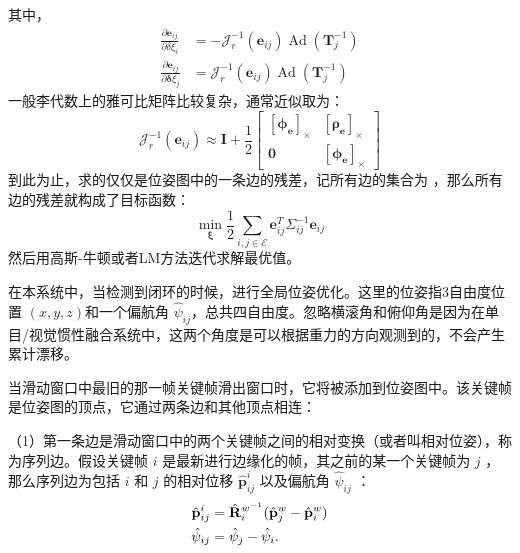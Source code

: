 其中，
\begin{equation}
\label{eqn:4.42}
\begin{aligned}
\frac{\partial \boldsymbol{e}_{i j}}{\partial \delta \xi_{i}} &= -\bm{\mathcal{J}}_{r}^{-1}\left(\boldsymbol{e}_{i j}\right) \operatorname{Ad}\left(\boldsymbol{T}_{j}^{-1}\right) \\
\frac{\partial \boldsymbol{e}_{i j}}{\partial \boldsymbol{\delta} \xi_{j}} &= \bm{\mathcal{J}}_{r}^{-1}\left(\boldsymbol{e}_{i j}\right) \operatorname{Ad}\left(\boldsymbol{T}_{j}^{-1}\right)
\end{aligned}
\end{equation}
一般李代数上的雅可比矩阵比较复杂，通常近似取为：
\begin{equation}
\label{eqn:4.43}
\bm{\mathcal{J}}_{r}^{-1}\left(\boldsymbol{e}_{i j}\right) \approx 
\boldsymbol{I}+\frac{1}{2} \left[ 
\begin{array}{cc}
{\left[\boldsymbol{\phi}_{\boldsymbol{e}} \right]_\times} & { \left[ \boldsymbol{\rho}_{\boldsymbol{e}} \right]_\times } \\ 
{\mathbf{0}} & { \left[\bm{\phi}_{\boldsymbol{e}}\right]_\times}
\end{array}
\right]
\end{equation}
到此为止，求的仅仅是位姿图中的一条边的残差，记所有边的集合为 ，那么所有边的残差就构成了目标函数：
\begin{equation}
\label{eqn:4.44}
\min _{\bm{\xi}} \frac{1}{2} \sum_{i, j \in \mathcal{E}} \bm{e}_{i j}^{T} \Sigma_{i j}^{-1} \bm{e}_{i j}
\end{equation}
然后用高斯-牛顿或者LM方法迭代求解最优值。

在本系统中，当检测到闭环的时候，进行全局位姿优化。这里的位姿指3自由度位置 $(x,y,z) $和一个偏航角 $\hat{\psi}_{ij} $，总共四自由度。忽略横滚角和俯仰角是因为在单目/视觉惯性融合系统中，这两个角度是可以根据重力的方向观测到的，不会产生累计漂移。

当滑动窗口中最旧的那一帧关键帧滑出窗口时，它将被添加到位姿图中。该关键帧是位姿图的顶点，它通过两条边和其他顶点相连：

（1）第一条边是滑动窗口中的两个关键帧之间的相对变换（或者叫相对位姿），称为序列边。假设关键帧 $i$ 是最新进行边缘化的帧，其之前的某一个关键帧为 $j$ ，那么序列边为包括 $i$ 和 $j$ 的相对位移 $\hat{\mathbf{p}}_{ij}^i $ 以及偏航角 $\hat{\psi}_{ij} $ ：
\begin{equation}
\label{eqn:4.45}
\setlength{\abovedisplayskip}{6pt}
\setlength{\belowdisplayskip}{6pt}
\begin{split}
\hat{\mathbf{p}}_{ij}^i&=\hat{\mathbf{R}}_i^{w^{-1}}(\hat{\mathbf{p}}_j^w-\hat{\mathbf{p}}_i^w) \\
\hat{\psi}_{ij}&=\hat{\psi}_j-\hat{\psi}_i.
\end{split}
\end{equation}


